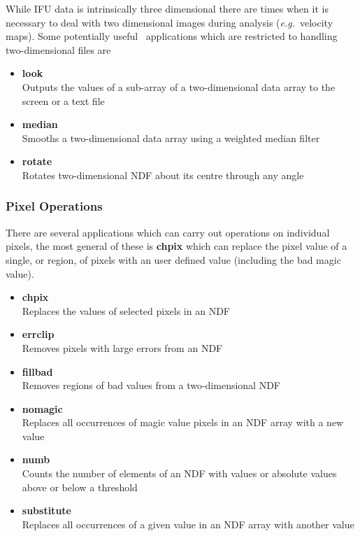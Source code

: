 \documentclass[twoside,11pt]{article}
\newcommand{\xref}[3]{#1}
\begin{document}
{While IFU data is intrinsically three dimensional there are times when
it is necessary to deal with two dimensional images during analysis
(\emph{e.g.}\ velocity maps).  Some potentially useful \KAPPA\
applications which are restricted to handling two-dimensional files
are

\begin{itemize}
\item{\xref{{\bf look}}{sun95}{LOOK}}\\
Outputs the values of a sub-array of a two-dimensional data array to the screen or a text file
\item{\xref{{\bf median}}{sun95}{MEDIAN}}\\ 
Smooths a two-dimensional data array using a weighted median filter 
\item{\xref{{\bf rotate}}{sun95}{ROTATE}}\\
Rotates two-dimensional NDF about its centre through any angle 
\end{itemize}
 
\subsubsection{Pixel Operations}

There are several applications which can carry out operations on
individual pixels, the most general of these is \xref{{\bf
chpix}}{sun95}{CHPIX} which can replace the pixel value of a single,
or region, of pixels with an user defined value (including the bad
\xref{magic value}{sun95}{se_masking}).

\begin{itemize}
\item{\xref{{\bf chpix}}{sun95}{CHPIX}}\\ 
Replaces the values of selected pixels in an NDF 
\item{\xref{{\bf errclip}}{sun95}{ERRCLIP}}\\ 
Removes pixels with large errors from an NDF 
\item{\xref{{\bf fillbad}}{sun95}{FILLBAD}}\\ 
Removes regions of bad values from a two-dimensional NDF 
\item{\xref{{\bf nomagic}}{sun95}{NOMAGIC}}\\ 
Replaces all occurrences of \xref{magic value}{sun95}{se_masking} 
pixels in an NDF array with a new value 
\item{\xref{{\bf numb}}{sun95}{NUMB}}\\ 
Counts the number of elements of an NDF with values or absolute values above or below a threshold 
\item{\xref{{\bf substitute}}{sun95}{SUBSTITUTE}}\\
Replaces all occurrences of a given value in an NDF array with another value 
\end{itemize}

}
\end{document}
